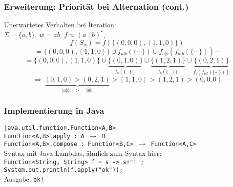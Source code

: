 \documentclass{beamer}
\begin{document}
    \begin{frame}[t]
        \frametitle{Erweiterung: Priorität bei Alternation (cont.)}
        Unerwartetes Verhalten bei Iteration:\\
        $\Sigma = \{a,b\},\ w = ab$. $f \approx (a\mid b)^*$.
        \pause
        $$
            f(S_w) = f(\{(0,0,0),(1,1,0)\})
        $$$$
            = \{(0,0,0),(1,1,0)\} \cup f_{a|b}(\{\cdots\}) \cup f_{a|b}(f_{a|b}(\{\cdots\})) \cdots
        $$$$
            = \{(0,0,0),(1,1,0)\}
            \cup \underbrace{\{(0,1,0)\}}_{f_a(\{\cdots\})}
            \cup \underbrace{\{(1,2,1)\}}_{f_b(\{\cdots\})}
            \cup \underbrace{\{(0,2,1)\}}_{f_b(f_{a|b}(\{\cdots\}))}
        $$
        \pause
        $$
            \,\Longrightarrow\, \underbrace{(0,1,0) > (0,2,1)}_{|a|b\quad >\quad |ab|} > (1,1,0) > (1,2,1) > (0,0,0)
        $$
    \end{frame}

    \begin{frame}[t]
        \frametitle{Implementierung in Java}
        \texttt{java.util.function.Function<A,B>}\\
        \texttt{Function<A,B>.apply :\ A $\to$ B}\\
        \texttt{Function<A,B>.compose :\ Function<B,C> $\to$ Function<A,C>}\\[10pt]
        \pause
        Syntax mit Java-Lambdas, ähnlich zum Syntax hier:\\[5pt]
        \texttt{Function<String, String> f = s -> s+"!";}\\
        \texttt{System.out.println(f.apply("ok"));}\\[5pt]
        Ausgabe: \texttt{ok!}\\[10pt]
    \end{frame}
\end{document}
